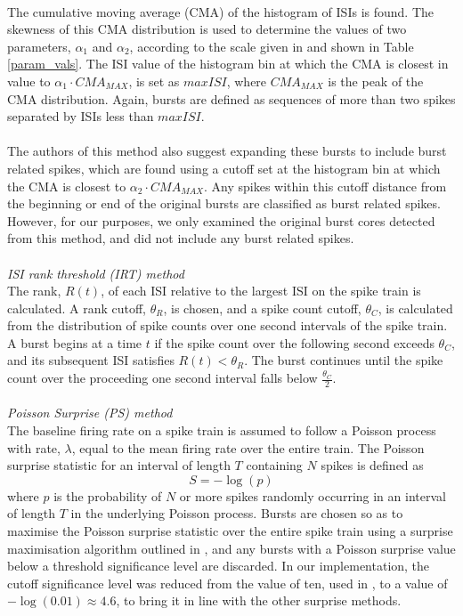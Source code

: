 \documentclass[12pt, titlepage]{article}
\begin{document}
	\\The cumulative moving average (CMA) of the histogram of ISIs is found. The skewness of this CMA distribution is used to determine the values of two parameters, $\alpha_1$ and $\alpha_2$,  according to the scale given in \cite{Kapucu2012} and shown in Table \ref{param_vals}. The ISI value of the histogram bin at which the CMA is closest in value to $\alpha_1 \cdot CMA_{MAX}$, is set as $maxISI$, where $CMA_{MAX}$ is the peak of the CMA distribution. Again, bursts are defined as sequences of more than two spikes separated by ISIs less than $maxISI$.
	\\ \\ The authors of this method also suggest expanding these bursts to include burst related spikes, which are found using a cutoff set at the histogram bin at which the CMA is closest to $\alpha_2 \cdot CMA_{MAX}$. Any spikes within this cutoff distance from the beginning or end of the original bursts are classified as burst related spikes. However, for our purposes, we only examined the original burst cores detected from this method, and did not include any burst related spikes.
	\\ \\ \textit{ISI rank threshold (IRT) method \cite{Hennig2011}}
	\\The rank, $R(t)$, of each ISI relative to the largest ISI on the spike train is calculated. A rank cutoff, $\theta_R$, is chosen, and a spike count cutoff, $\theta_C$, is calculated from the distribution of spike counts over one second intervals of the spike train. A burst begins at a time $t$ if the spike count over the following second exceeds $\theta_C$, and its subsequent ISI satisfies $R(t)<\theta_R$. The burst continues until the spike count over the proceeding one second interval falls below $\frac{\theta_C}{2}$.
	\\ \\ \textit{Poisson Surprise (PS) method \cite{Legendy1985}}
	\\The baseline firing rate on a spike train is assumed to follow a Poisson process with rate, $\lambda$, equal to the mean firing rate over the entire train. The Poisson surprise statistic for an interval of length $T$ containing $N$ spikes is defined as 
	\[S = -\log(p)\] 
	where $p$ is the probability of $N$ or more spikes randomly occurring in an interval of length $T$ in the underlying Poisson process. Bursts are chosen so as to maximise the Poisson surprise statistic over the entire spike train using a surprise maximisation algorithm outlined in \cite{Legendy1985}, and any bursts with a Poisson surprise value below a threshold significance level are discarded. In our implementation, the cutoff significance level was reduced from the value of ten, used in \cite{Legendy1985}, to a value of $-\log(0.01)\approx 4.6$, to bring it in line with the other surprise methods.
\end{document}
